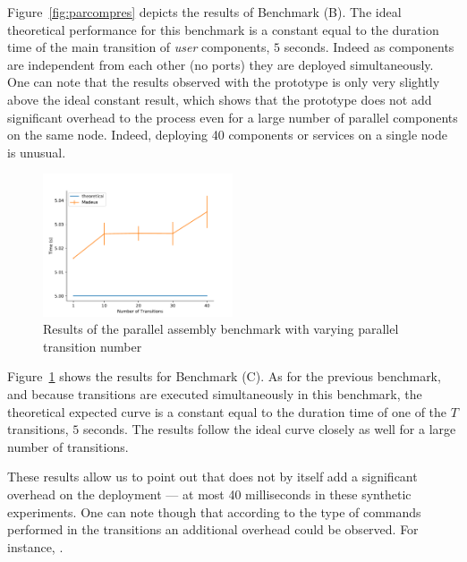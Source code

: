 Figure~\ref{fig:parcompres} depicts the results of Benchmark (B). The
ideal theoretical performance for this benchmark is a constant equal
to the duration time of the main transition of \emph{user} components,
\ie $5$ seconds. Indeed as components are independent from each other
(no ports) they are deployed simultaneously.
One can note that the results observed with the \mad prototype is only
very slightly above the ideal constant result, which shows that the
prototype does not add significant overhead to the process even for a
large number of parallel components on the same node. Indeed,
deploying 40 components or services on a single node is unusual.

\begin{figure}[h]
  \begin{center} 
    \includegraphics[width=0.5\textwidth]{./images/evaluations_par_transitions.pdf}
    \caption{Results of the parallel assembly benchmark with varying parallel transition number}
    \label{fig:partrans}
  \end{center}
\end{figure}

Figure~\ref{fig:partrans} shows the results for Benchmark (C). As for
the previous benchmark, and because transitions are executed
simultaneously in this benchmark, the theoretical expected curve is a
constant equal to the duration time of one of the $T$ transitions, \ie
$5$ seconds. The results follow the ideal curve closely as well for a
large number of transitions.


These results allow us to point out that \mad does not by itself add a
significant overhead on the deployment --- at most 40 milliseconds in these synthetic experiments.
One can note though that according to
the type of commands performed in the transitions  an additional
overhead could be observed. For instance, .


